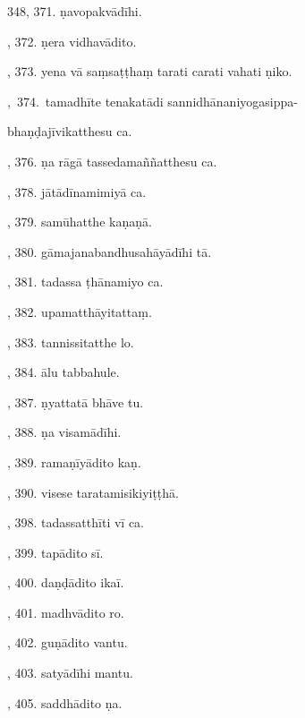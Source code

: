 348, 371. ṇavopakvādīhi.\hfill \pageref{sut:348}\par {}, 372. ṇera vidhavādito.\hfill \pageref{sut:349}\par {}, 373. yena vā saṃsaṭṭhaṃ tarati carati vahati ṇiko.\hfill \pageref{sut:350}\par {},~374.~tamadhīte tenakatādi sannidhānaniyogasippa-\par \noindent
\hspace{15mm} bhaṇḍajīvikatthesu ca.\hfill \pageref{sut:351}\par {}, 376. ṇa rāgā tassedamaññatthesu ca.\hfill \pageref{sut:352}\par {}, 378. jātādīnamimiyā ca.\hfill \pageref{sut:353}\par {}, 379. samūhatthe kaṇaṇā.\hfill \pageref{sut:354}\par {}, 380. gāmajanabandhusahāyādīhi tā.\hfill \pageref{sut:355}\par {}, 381. tadassa ṭhānamiyo ca.\hfill \pageref{sut:356}\par {}, 382. upamatthāyitattaṃ.\hfill \pageref{sut:357}\par {}, 383. tannissitatthe lo.\hfill \pageref{sut:358}\par {}, 384. ālu tabbahule.\hfill \pageref{sut:359}\par {}, 387. ṇyattatā bhāve tu.\hfill \pageref{sut:360}\par {}, 388. ṇa visamādīhi.\hfill \pageref{sut:361}\par {}, 389. ramaṇīyādito kaṇ.\hfill \pageref{sut:362}\par {}, 390. visese taratamisikiyiṭṭhā.\hfill \pageref{sut:363}\par {}, 398. tadassatthīti vī ca.\hfill \pageref{sut:364}\par {}, 399. tapādito sī.\hfill \pageref{sut:365}\par {}, 400. daṇḍādito ikaī.\hfill \pageref{sut:366}\par {}, 401. madhvādito ro.\hfill \pageref{sut:367}\par {}, 402. guṇādito vantu.\hfill \pageref{sut:368}\par {}, 403. satyādīhi mantu.\hfill \pageref{sut:369}\par {}, 405. saddhādito ṇa.\hfill \pageref{sut:370}\par \noindent

